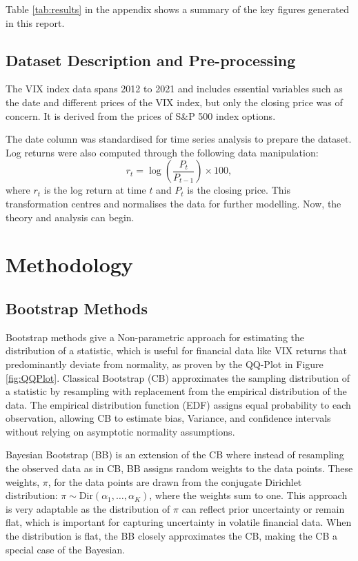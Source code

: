 \documentclass[12pt]{report} %
\begin{document}
\noindent Table \ref{tab:results} in the appendix shows a summary of the key figures generated in this report.

\section{Dataset Description and Pre-processing}

The VIX index data spans 2012 to 2021 and includes essential variables such as the date and different prices of the VIX index, but only the closing price was of concern. It is derived from the prices of S\&P 500 index options.\cite{kuepper2024vix} 

The date column was standardised for time series analysis to prepare the dataset. Log returns were also computed through the following data manipulation:
\[
r_t = \log\left(\frac{P_t}{P_{t-1}}\right) \times 100,
\]
where \( r_t \) is the log return at time \( t \) and \( P_t \) is the closing price. This transformation centres and normalises the data for further modelling. Now, the theory and analysis can begin.


\chapter{Methodology}
\section{Bootstrap Methods}
Bootstrap methods give a Non-parametric approach for estimating the distribution of a statistic, which is useful for financial data like VIX returns that predominantly deviate from normality, as proven by the QQ-Plot in Figure \ref{fig:QQPlot}. Classical Bootstrap (CB) approximates the sampling distribution of a statistic by resampling with replacement from the empirical distribution of the data.\cite{bland2015bootstrap} The empirical distribution function (EDF) assigns equal probability to each observation, allowing CB to estimate bias, Variance, and confidence intervals without relying on asymptotic normality assumptions.\cite{perrakis2024nonparametric} 

Bayesian Bootstrap (BB) is an extension of the CB where instead of resampling the observed data as in CB, BB assigns random weights to the data points. These weights, $\pi$, for the data points are drawn from the conjugate Dirichlet distribution:  $ \pi \sim \text{Dir}(\alpha_1, \dots, \alpha_K)$, where the weights sum to one. This approach is very adaptable as the distribution of $\pi$ can reflect prior uncertainty or remain flat, which is important for capturing uncertainty in volatile financial data. When the distribution is flat, the BB closely approximates the CB, making the CB a special case of the Bayesian. \cite{perrakis2024nonparametric}
\end{document}
